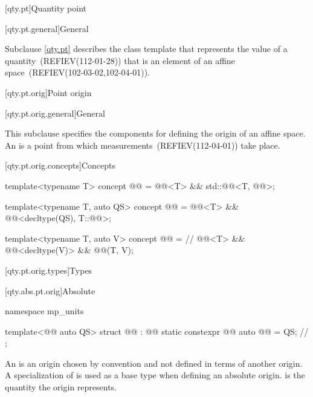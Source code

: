 [qty.pt]{Quantity point}

[qty.pt.general]{General}

\pnum
Subclause \ref{qty.pt} describes the class template 
that represents the value of a quantity~(REFIEV(112-01-28))
that is an element of an affine space~(REFIEV(102-03-02,102-04-01)).

[qty.pt.orig]{Point origin}

[qty.pt.orig.general]{General}

\pnum
This subclause specifies the components
for defining the origin of an affine space.
An  is a point from which measurements~(REFIEV(112-04-01)) take place.

[qty.pt.orig.concepts]{Concepts}

\begin{itemdecl}
template<typename T>
concept @@ = @@<T> && std::@@<T, @@>;

template<typename T, auto QS>
concept @@ = @@<T> && @@<decltype(QS), T::@@>;

template<typename T, auto V>
concept @@ =  // \expos
  @@<T> && @@<decltype(V)> && @@(T{}, V);
\end{itemdecl}

[qty.pt.orig.types]{Types}

[qty.abs.pt.orig]{Absolute}

\begin{codeblock}
namespace mp_units {

template<@@ auto QS>
struct @@ : @@ {
  static constexpr @@ auto @@ = QS;  // \expos
};

}
\end{codeblock}

\pnum
An  is an origin
chosen by convention and not defined in terms of another origin.
A specialization of  is used as a base type when defining an absolute origin.
 is the quantity the origin represents.

